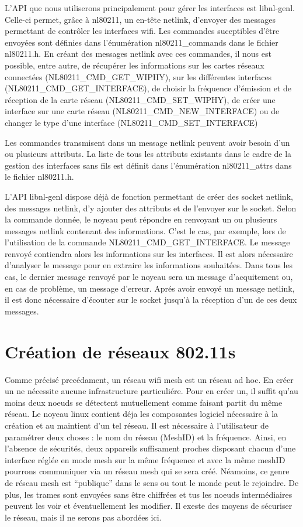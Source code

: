L'API que nous utiliserons principalement pour gérer les interfaces est libnl-genl. Celle-ci permet, grâce à nl80211, un
en-tête netlink, d'envoyer des messages permettant de contrôler les interfaces wifi. Les commandes suceptibles d'être envoyées
sont définies dans l'énumération nl80211\_\-commands dans le fichier nl80211.h. En créant des messages netlink avec ces commandes,
il nous est possible, entre autre, de récupérer les informations sur les cartes réseaux connectées (NL80211\_\-CMD\_\-GET\_\-WIPHY),
sur les différentes interfaces (NL80211\_\-CMD\_\-GET\_\-INTERFACE), de choisir la fréquence d'émission et de réception de la
carte réseau (NL80211\_\-CMD\_\-SET\_\-WIPHY), de créer une interface sur une carte réseau (NL80211\_\-CMD\_\-NEW\_\-INTERFACE) ou de 
changer le type d'une interface (NL80211\_\-CMD\_\-SET\_\-INTERFACE)


Les commandes transmisent dans un message netlink peuvent avoir besoin d'un ou plusieurs attributs. La liste de tous les 
attributs existants dans le cadre de la gestion des interfaces sans fils est définit dans l'énumération nl80211\_\-attrs dans
le fichier nl80211.h.

L'API libnl-genl dispose déjà de fonction permettant de créer des socket netlink, des messages netlink, d'y ajouter des attributs
et de l'envoyer sur le socket. Selon la commande donnée, le noyeau peut répondre en renvoyant un ou plusieurs messages
netlink contenant des informations. C'est le cas, par exemple, lors de l'utilisation de la commande NL80211\_\-CMD\_\-GET\_\-INTERFACE.
Le message renvoyé contiendra alors les informations sur les interfaces. Il est alors nécessaire d'analyser le message pour 
en extraire les informations souhaitées. Dans tous les cas, le dernier message renvoyé par le noyeau sera un message
d'acquitement ou, en cas de problème, un message d'erreur. Aprés avoir envoyé un message netlink, il est donc nécessaire
d'écouter sur le socket jusqu'à la réception d'un de ces deux messages.

\section{Création de réseaux 802.11s}

Comme précisé precédament, un réseau wifi mesh est un réseau ad hoc. En créer un ne nécessite aucune infrastructure particuliére. 
Pour en créer un, il suffit qu'au moins deux noeuds se détectent mutuellement comme faisant partit du même réseau. Le noyeau linux 
contient déja les composantes logiciel nécessaire à la création et au maintient d'un tel réseau. Il est nécessaire à l'utilisateur de
paramétrer deux choses : le nom du réseau (MeshID) et la fréquence\cite{MNcreate}. Ainsi, en l'absence de sécurités, deux appareils
suffisament proches disposant chacun d'une interface réglée en mode mesh sur la même fréquence et avec la même meshID pourrons
communiquer via un réseau mesh qui se sera créé. Néamoins, ce genre de réseau mesh est ``publique'' dans le sens ou tout le monde
peut le rejoindre. De plus, les trames sont envoyées sans être chiffrées et tus les noeuds intermédiaires peuvent les voir et 
éventuellement les modifier. Il exeste des moyens de sécuriser le réseau, mais il ne serons pas abordées ici.

